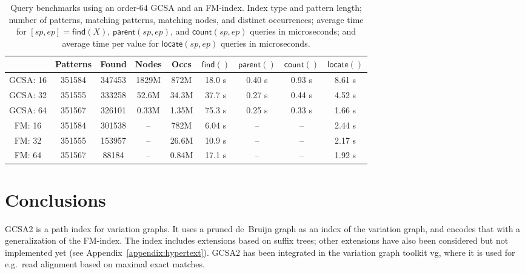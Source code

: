 \documentclass[a4paper,UKenglish]{lipics-v2016}
\newcommand{\find}{\ensuremath{\mathsf{find}}}
\newcommand{\locate}{\ensuremath{\mathsf{locate}}}
\newcommand{\parent}{\ensuremath{\mathsf{parent}}}
\newcommand{\countq}{\ensuremath{\mathsf{count}}}
\newcommand{\orderk}[1]{order\nobreakdash-$#1$}
\begin{document}
\begin{table}[t!]
\begin{center}
\caption{Query benchmarks using an \orderk{64} GCSA and an FM\nobreakdash-index. Index type and pattern length; number of patterns, matching patterns, matching nodes, and distinct occurrences; average time for $[sp, ep] = \find(X)$, $\parent(sp, ep)$, and $\countq(sp, ep)$ queries in microseconds; and average time per value for $\locate(sp, ep)$ queries in microseconds.}\label{table:benchmark}
\begin{tabular}{c|cccc|cccc}
\hline
 & \textbf{Patterns} & \textbf{Found} & \textbf{Nodes} & \textbf{Occs} & $\find()$ & $\parent()$ & $\countq()$ & $\locate()$ \\
\hline
GCSA: 16 & 351584 & 347453 & 1829M &  872M & 18.0 \textmu{}s & 0.40 \textmu{}s & 0.93 \textmu{}s & 8.61 \textmu{}s \\
GCSA: 32 & 351555 & 333258 & 52.6M & 34.3M & 37.7 \textmu{}s & 0.27 \textmu{}s & 0.44 \textmu{}s & 4.52 \textmu{}s \\
GCSA: 64 & 351567 & 326101 & 0.33M & 1.35M & 75.3 \textmu{}s & 0.25 \textmu{}s & 0.33 \textmu{}s & 1.66 \textmu{}s \\
\hline
FM:   16 & 351584 & 301538 &    -- &  782M & 6.04 \textmu{}s &              -- &              -- & 2.44 \textmu{}s \\
FM:   32 & 351555 & 153957 &    -- & 26.6M & 10.9 \textmu{}s &              -- &              -- & 2.17 \textmu{}s \\
FM:   64 & 351567 &  88184 &    -- & 0.84M & 17.1 \textmu{}s &              -- &              -- & 1.92 \textmu{}s \\
\hline
\end{tabular}
\end{center}
\end{table}


\section{Conclusions}

GCSA2 is a path index for variation graphs. It uses a pruned de~Bruijn graph as an index of the variation graph, and encodes that with a generalization of the FM\nobreakdash-index. The index includes extensions based on suffix trees; other extensions have also been considered but not implemented yet (see Appendix~\ref{appendix:hypertext}). GCSA2 has been integrated in the variation graph toolkit vg, where it is used for e.g.~read alignment based on maximal exact matches.
\end{document}

